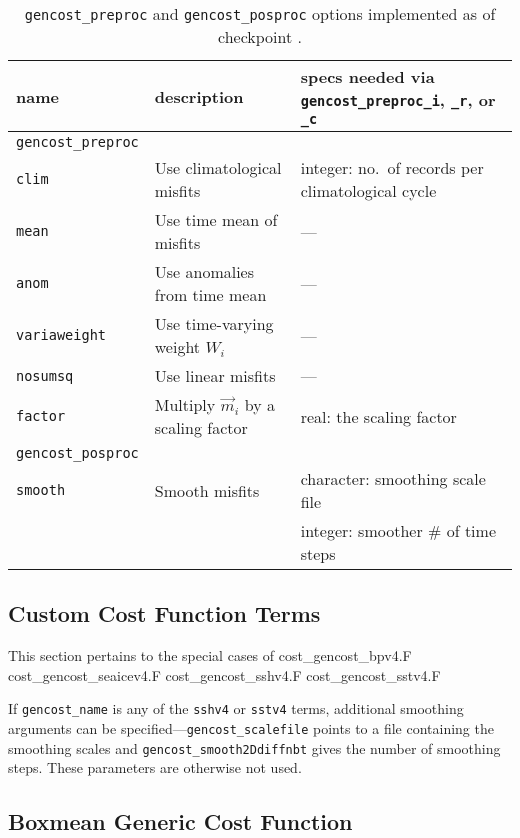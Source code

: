 \begin{table}[!ht]
\centering
\begin{tabular}{lll}
name					&	description					&	specs needed via \texttt{gencost\_preproc\_i}, \texttt{\_r}, or \texttt{\_c} \\ \hline\hline
\texttt{gencost\_preproc} \\ \hline
\texttt{clim} 				&	Use climatological misfits	&	integer: no.\ of records per climatological cycle \\
\texttt{mean} 				&	Use time mean of misfits 	&	--- \\
\texttt{anom} 				&	Use anomalies from time mean &	--- \\
\texttt{variaweight}		&	Use time-varying weight $W_i$&	--- \\
\texttt{nosumsq} 			&	Use linear misfits 			&	--- \\
\texttt{factor} 			&	Multiply $\vec{m}_i$ by a scaling factor	&	real: the scaling factor \\ \hline \hline
\texttt{gencost\_posproc} \\ \hline
\texttt{smooth} 			&	Smooth misfits				&	character: smoothing scale file\\ 
						&								&	integer: smoother \# of time steps \\
\end{tabular} 
\caption{\texttt{gencost\_preproc} and \texttt{gencost\_posproc} options implemented as of checkpoint \mitgcmCheckpointVersion.}
\label{tbl:gencost_ecco_preproc}
\end{table}

\clearpage

\subsection{Custom Cost Function Terms} \label{v4custom}

This section pertains to the special cases of cost\_gencost\_bpv4.F  cost\_gencost\_seaicev4.F  cost\_gencost\_sshv4.F  cost\_gencost\_sstv4.F

If \texttt{gencost\_name} is any of the \texttt{sshv4} or \texttt{sstv4} terms, additional smoothing arguments can be specified---\texttt{gencost\_scalefile} points to a file containing the smoothing scales and \texttt{gencost\_smooth2Ddiffnbt} gives the number of smoothing steps. These parameters are otherwise not used.

\subsection{Boxmean Generic Cost Function} \label{genboxmean}

